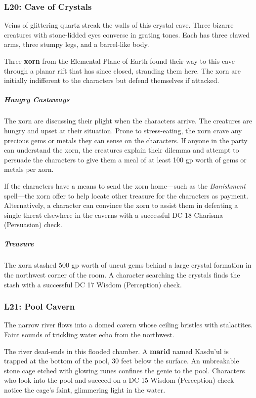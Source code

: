 \documentclass[10pt,a4paper,twoside,bg=print,twocolumn,openany,nodeprecatedcode]{dndbook}
\begin{document}
\subsubsection{L20: Cave of Crystals}
\begin{DndReadAloud}{}
Veins of glittering quartz streak the walls of this crystal cave. Three bizarre creatures with stone-lidded eyes converse in grating tones. Each has three clawed arms, three stumpy legs, and a barrel-like body.

\end{DndReadAloud}

Three \textbf{xorn} from the Elemental Plane of Earth found their way to this cave through a planar rift that has since closed, stranding them here. The xorn are initially indifferent to the characters but defend themselves if attacked.

\subparagraph{Hungry Castaways}
The xorn are discussing their plight when the characters arrive. The creatures are hungry and upset at their situation. Prone to stress-eating, the xorn crave any precious gems or metals they can sense on the characters. If anyone in the party can understand the xorn, the creatures explain their dilemma and attempt to persuade the characters to give them a meal of at least 100 gp worth of gems or metals per xorn.

If the characters have a means to send the xorn home—such as the \textit{Banishment} spell—the xorn offer to help locate other treasure for the characters as payment. Alternatively, a character can convince the xorn to assist them in defeating a single threat elsewhere in the caverns with a successful DC 18 Charisma (Persuasion) check.

\subparagraph{Treasure}
The xorn stashed 500 gp worth of uncut gems behind a large crystal formation in the northwest corner of the room. A character searching the crystals finds the stash with a successful DC 17 Wisdom (Perception) check.

\subsubsection{L21: Pool Cavern}
\begin{DndReadAloud}{}
The narrow river flows into a domed cavern whose ceiling bristles with stalactites. Faint sounds of trickling water echo from the northwest.

\end{DndReadAloud}

The river dead-ends in this flooded chamber. A \textbf{marid} named Kasdu'ul is trapped at the bottom of the pool, 30 feet below the surface. An unbreakable stone cage etched with glowing runes confines the genie to the pool. Characters who look into the pool and succeed on a DC 15 Wisdom (Perception) check notice the cage's faint, glimmering light in the water.
\end{document}
